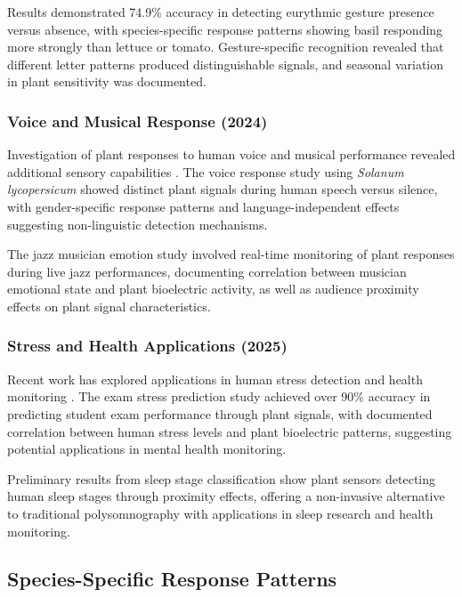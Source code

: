 \documentclass{article}
\begin{document}
Results demonstrated 74.9\% accuracy in detecting eurythmic gesture presence versus absence, with species-specific response patterns showing basil responding more strongly than lettuce or tomato. Gesture-specific recognition revealed that different letter patterns produced distinguishable signals, and seasonal variation in plant sensitivity was documented.

\subsubsection{Voice and Musical Response (2024)}

Investigation of plant responses to human voice and musical performance revealed additional sensory capabilities \cite{fuchs2024plants, bhave2024using}. The voice response study using \textit{Solanum lycopersicum} showed distinct plant signals during human speech versus silence, with gender-specific response patterns and language-independent effects suggesting non-linguistic detection mechanisms.

The jazz musician emotion study involved real-time monitoring of plant responses during live jazz performances, documenting correlation between musician emotional state and plant bioelectric activity, as well as audience proximity effects on plant signal characteristics.

\subsubsection{Stress and Health Applications (2025)}

Recent work has explored applications in human stress detection and health monitoring \cite{smolin2025predicting}. The exam stress prediction study achieved over 90\% accuracy in predicting student exam performance through plant signals, with documented correlation between human stress levels and plant bioelectric patterns, suggesting potential applications in mental health monitoring.

Preliminary results from sleep stage classification show plant sensors detecting human sleep stages through proximity effects, offering a non-invasive alternative to traditional polysomnography with applications in sleep research and health monitoring.

\subsection{Species-Specific Response Patterns}
\end{document}
